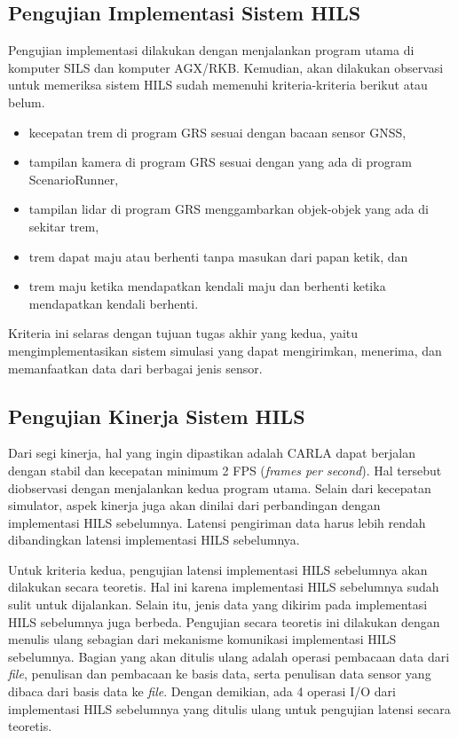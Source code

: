 \subsection{Pengujian Implementasi Sistem HILS}

Pengujian implementasi dilakukan dengan menjalankan program utama di komputer
SILS dan komputer AGX/RKB. Kemudian, akan dilakukan observasi untuk memeriksa
sistem HILS sudah memenuhi kriteria-kriteria berikut atau belum.

\begin{itemize}
	\item kecepatan trem di program GRS sesuai dengan bacaan sensor GNSS,
	\item tampilan kamera di program GRS sesuai dengan yang ada di program
		ScenarioRunner,
	\item tampilan lidar di program GRS menggambarkan objek-objek yang ada di
		sekitar trem,
	\item trem dapat maju atau berhenti tanpa masukan dari papan ketik, dan
	\item trem maju ketika mendapatkan kendali maju dan berhenti ketika
		mendapatkan kendali berhenti.
\end{itemize}

Kriteria ini selaras dengan tujuan tugas akhir yang kedua, yaitu
mengimplementasikan sistem simulasi yang dapat mengirimkan, menerima, dan
memanfaatkan data dari berbagai jenis sensor.

\subsection{Pengujian Kinerja Sistem HILS}

Dari segi kinerja, hal yang ingin dipastikan adalah CARLA dapat berjalan dengan
stabil dan kecepatan minimum 2 FPS (\textit{frames per second}). Hal tersebut
diobservasi dengan menjalankan kedua program utama. Selain dari kecepatan
simulator, aspek kinerja juga akan dinilai dari perbandingan dengan implementasi
HILS sebelumnya. Latensi pengiriman data harus lebih rendah dibandingkan latensi
implementasi HILS sebelumnya.

Untuk kriteria kedua, pengujian latensi implementasi HILS sebelumnya akan
dilakukan secara teoretis. Hal ini karena implementasi HILS sebelumnya sudah
sulit untuk dijalankan. Selain itu, jenis data yang dikirim pada implementasi
HILS sebelumnya juga berbeda. Pengujian secara teoretis ini dilakukan dengan
menulis ulang sebagian dari mekanisme komunikasi implementasi HILS sebelumnya.
Bagian yang akan ditulis ulang adalah operasi pembacaan data dari \textit{file},
penulisan dan pembacaan ke basis data, serta penulisan data sensor yang dibaca
dari basis data ke \textit{file}. Dengan demikian, ada 4 operasi I/O dari
implementasi HILS sebelumnya yang ditulis ulang untuk pengujian latensi secara
teoretis.

